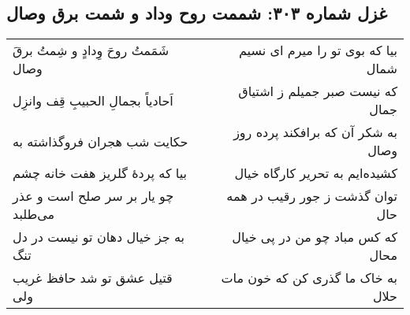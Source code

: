 \begin{center}
\section*{غزل شماره ۳۰۳: شممت روح وداد و شمت برق وصال}
\label{sec:sh303}
\begin{longtable}{l p{0.5cm} r}
شَمَمتُ روحَ وِدادٍ و شِمتُ برقَ وصال
&&
بیا که بوی تو را میرم ای نسیم شمال
\\
اَحادیاً بجمالِ الحبیبِ قِف وانزِل
&&
که نیست صبر جمیلم ز اشتیاق جمال
\\
حکایت شب هجران فروگذاشته به
&&
به شکر آن که برافکند پرده روز وصال
\\
بیا که پردهٔ گلریز هفت خانه چشم
&&
کشیده‌ایم به تحریر کارگاه خیال
\\
چو یار بر سر صلح است و عذر می‌طلبد
&&
توان گذشت ز جور رقیب در همه حال
\\
به جز خیال دهان تو نیست در دل تنگ
&&
که کس مباد چو من در پی خیال محال
\\
قتیل عشق تو شد حافظ غریب ولی
&&
به خاک ما گذری کن که خون مات حلال
\\
\end{longtable}
\end{center}
